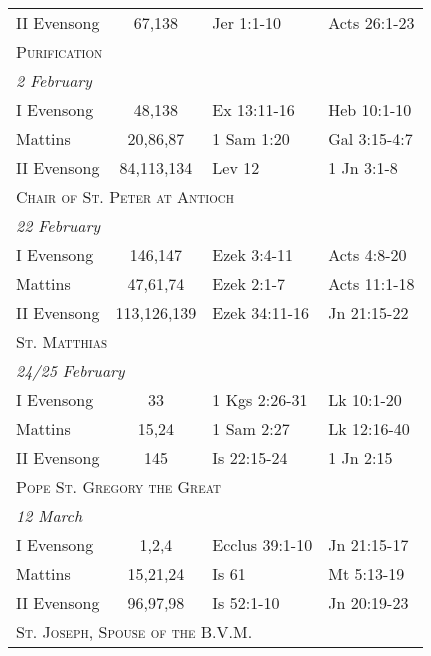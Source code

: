 \begin{longtable}{l c l l}
\hspace{1em} II Evensong&67,138&Jer 1:1-10&Acts 26:1-23\\
\multicolumn{4}{l}{\textsc{Purification}}\\
\multicolumn{4}{l}{\textit{2 February}}\\
\hspace{1em} I Evensong&48,138&Ex 13:11-16&Heb 10:1-10\\
\hspace{1em} Mattins&20,86,87&1 Sam 1:20&Gal 3:15-4:7\\
\hspace{1em} II Evensong&84,113,134&Lev 12&1 Jn 3:1-8\\
\multicolumn{4}{l}{\textsc{Chair of St. Peter at Antioch}}\\
\multicolumn{4}{l}{\textit{22 February}}\\
\hspace{1em} I Evensong&146,147&Ezek 3:4-11&Acts 4:8-20\\
\hspace{1em} Mattins&47,61,74&Ezek 2:1-7&Acts 11:1-18\\
\hspace{1em} II Evensong&113,126,139&Ezek 34:11-16&Jn 21:15-22\\
\multicolumn{4}{l}{\textsc{St. Matthias}}\\
\multicolumn{4}{l}{\textit{24/25 February}}\\
\hspace{1em} I Evensong&33&1 Kgs 2:26-31&Lk 10:1-20\\
\hspace{1em} Mattins&15,24&1 Sam 2:27&Lk 12:16-40\\
\hspace{1em} II Evensong&145&Is 22:15-24&1 Jn 2:15\\
\multicolumn{4}{l}{\textsc{Pope St. Gregory the Great}}\\
\multicolumn{4}{l}{\textit{12 March}}\\
\hspace{1em} I Evensong&1,2,4&Ecclus 39:1-10&Jn 21:15-17\\
\hspace{1em} Mattins&15,21,24&Is 61&Mt 5:13-19\\
\hspace{1em} II Evensong&96,97,98&Is 52:1-10&Jn 20:19-23\\
\multicolumn{4}{l}{\textsc{St. Joseph, Spouse of the B.V.M.}}\\

\end{longtable}
